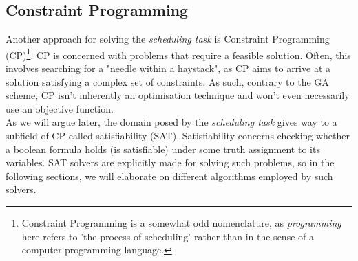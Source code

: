 \subsection{Constraint Programming}
Another approach for solving the \textit{scheduling task} is Constraint Programming (CP)\footnote{Constraint Programming is a somewhat odd nomenclature, as \textit{programming} here refers to 'the process of scheduling' rather than in the sense of a computer programming language.}. CP is concerned with problems that require a feasible solution. Often, this involves searching for a "needle within a haystack", as CP aims to arrive at a solution satisfying a complex set of constraints. As such, contrary to the GA scheme, CP isn't inherently an optimisation technique and won't even necessarily use an objective function.
\\
As we will argue later, the domain posed by the \textit{scheduling task} gives way to a subfield of CP called satisfiability (SAT). Satisfiability concerns checking whether a boolean formula holds (is satisfiable) under some truth assignment to its variables. SAT solvers are explicitly made for solving such problems, so in the following sections, we will elaborate on different algorithms employed by such solvers.

